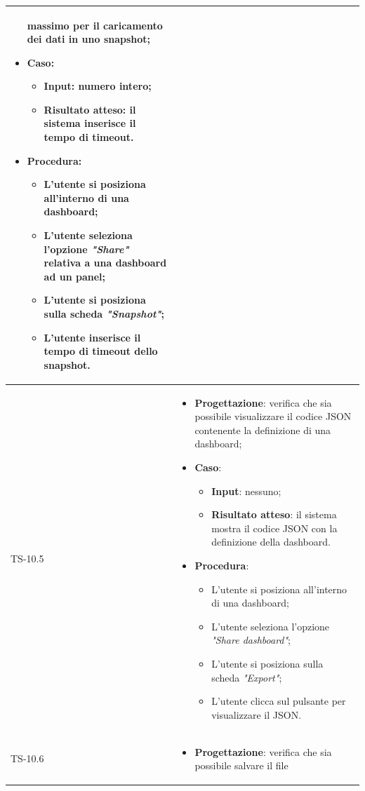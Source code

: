 \begin{longtable}{|C{2.5cm}|C{13cm}|}
\begin{itemize}
	massimo per il caricamento dei dati in uno snapshot;
	\item \textbf{Caso}: 
	\begin{itemize}
		\item \textbf{Input}: numero intero;
		\item \textbf{Risultato atteso}: il sistema inserisce il tempo di timeout.
	\end{itemize}
	\item \textbf{Procedura}:
	\begin{itemize}
		\item L'utente si posiziona all'interno di una dashboard;
		\item L'utente seleziona l'opzione \emph{"Share"} relativa a una dashboard ad un panel;
		\item L'utente si posiziona sulla scheda \emph{"Snapshot"};
		\item L'utente inserisce il tempo di timeout dello snapshot.
	\end{itemize} 
\end{itemize}
	\\
	\hline
	{TS-10.5} &
\begin{itemize}
	\item \textbf{Progettazione}: verifica che sia possibile visualizzare il
	codice JSON contenente la definizione di una dashboard;
	\item \textbf{Caso}: 
	\begin{itemize}
		\item \textbf{Input}: nessuno;
		\item \textbf{Risultato atteso}: il sistema mostra il codice JSON con la definizione della dashboard.
	\end{itemize}
	\item \textbf{Procedura}:
	\begin{itemize}
		\item L'utente si posiziona all'interno di una dashboard;
		\item L'utente seleziona l'opzione \emph{"Share dashboard"};
		\item L'utente si posiziona sulla scheda \emph{"Export"};
		\item L'utente clicca sul pulsante per visualizzare il JSON.
	\end{itemize} 
\end{itemize}
	  \\
	\hline
	{TS-10.6} & 
\begin{itemize}
	\item \textbf{Progettazione}: verifica che sia possibile salvare il file

\end{itemize}
\end{longtable}
